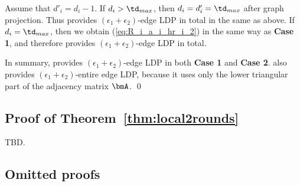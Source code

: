 Assume that $d'_i = d_i - 1$. 
If $d_i > \td_{max}$, then $d_i = d'_i = \td_{max}$ after graph projection. 
Thus  provides $(\epsilon_1 + \epsilon_2)$-edge LDP in total in the same as above. 
If $d_i = \td_{max}$, then we obtain (\ref{eq:R_i_a_i_hr_i_2}) in the same way as \textbf{Case 1}, and therefore  provides $(\epsilon_1 + \epsilon_2)$-edge LDP in total.

\smallskip
In summary,  provides $(\epsilon_1 + \epsilon_2)$-edge LDP in both \textbf{Case 1} and \textbf{Case 2}. 
 also provides $(\epsilon_1 + \epsilon_2)$-entire edge LDP, because it uses only the lower triangular part of the adjacency matrix $\bmA$. \qed

\subsection{Proof of Theorem~\ref{thm:local2rounds}}
TBD.


\subsection{Omitted proofs}




